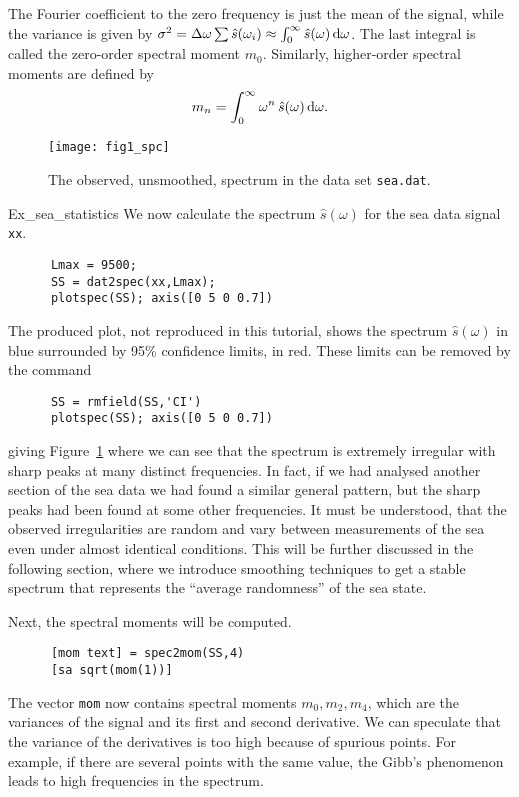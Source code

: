 The Fourier coefficient to the zero frequency
is just the mean of the signal, while the variance is given by
$\sigma^2=\Delta\omega\sum \hat{s}(\omega_i)
\approx \int_0^\infty \hat{s}(\omega)\, \mathrm{d}\omega$. The last integral
is called the zero-order spectral moment $m_0$. Similarly,
higher-order spectral moments are defined by 
$$
m_n=\int_0^\infty \omega^n \, \hat{s}(\omega)\, \mathrm{d} \omega.
$$

\begin{figure}[t]
\centering
\texttt{[image: fig1\_spc]}
\vspace{-3mm}
\caption[Non-smoothed spectrum of  {\tt sea.dat}]{
The observed, unsmoothed,  spectrum in the data set {\tt sea.dat}.}
  \label{fig1_spc}
\end{figure}

\begin{cex}{Ex_sea_statistics}
We now calculate the spectrum $\widehat{s}(\omega)$ for the
sea data signal {\tt xx}. 
{\small\begin{verbatim}
      Lmax = 9500;
      SS = dat2spec(xx,Lmax);
      plotspec(SS); axis([0 5 0 0.7])
\end{verbatim}}

The produced plot, not reproduced in this tutorial, shows the spectrum 
$\widehat{s}(\omega)$ in blue surrounded by 95\% confidence limits, 
in red. These limits can be removed by the command
{\small\begin{verbatim}
      SS = rmfield(SS,'CI')
      plotspec(SS); axis([0 5 0 0.7])
\end{verbatim}}
\noindent giving Figure~\ref{fig1_spc} where we can see that the 
spectrum is extremely
irregular with sharp peaks at many distinct frequencies.
In fact, if we had analysed another section of the sea data we had
found a similar general pattern, but the sharp peaks had been found at
some other frequencies. It must be understood, that the observed
irregularities are random and vary between measurements of the sea
even under almost identical conditions.
This will be further discussed in the following section, where we
introduce smoothing techniques to get a stable spectrum that
represents the ``average randomness'' of the sea state.

Next, the spectral moments will be computed.
{\small\begin{verbatim}
      [mom text] = spec2mom(SS,4)
      [sa sqrt(mom(1))]
\end{verbatim}}
The vector {\tt mom} now contains spectral moments $m_0, m_2, m_4$,
which are the variances of the signal and its  first and second
derivative. We can speculate that the variance of
the derivatives is too high because of spurious points.
For example, if there are several points with the same
value, the Gibb's phenomenon leads to high frequencies in the spectrum.
\end{cex}

